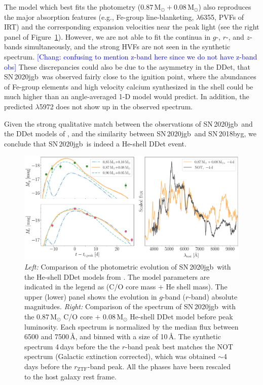 \documentclass[twocolumn]{aastex631}
\newcommand{\sn}{SN\,2020jgb}
\newcommand{\chang}[1]{\textcolor{blue}{[Chang: #1]}}
\begin{document}
The model which best fits the photometry ($0.87\,\mathrm{M_\odot}+0.08\,\mathrm{M_\odot}$) also reproduces the major absorption features (e.g., Fe-group line-blanketing,  $\lambda$6355, PVFs of  IRT) and the corresponding expansion velocities near the peak light (see the right panel of Figure~\ref{fig:model}). However, we are not able to fit the continua in $g$-, $r$-, and $z$-bands simultaneously, and the strong  HVFs are not seen in the synthetic spectrum. \chang{confusing to mention z-band here since we do not have z-band obs} These discrepancies could also be due to the asymmetry in the DDet, that \sn\ was observed fairly close to the ignition point, where the abundances of Fe-group elements and high velocity calcium synthesized in the shell could be much higher than an angle-averaged 1-D model would predict.
In addition, the predicted  $\lambda$5972 does not show up in the observed spectrum.

Given the strong qualitative match between the observations of \sn\ and the DDet models of \citet{polin_observational_2019}, and the similarity between \sn\ and SN\,2018byg, we conclude that \sn\ is indeed a He-shell DDet event. 

\begin{figure}
    \centering
    \includegraphics[width=\textwidth]{model.pdf}
    \caption{{\it Left:} Comparison of the photometric evolution of \sn\ with the He-shell DDet models from \citet{polin_observational_2019}. The model parameters are indicated in the legend as (C/O core mass $+$ He shell mass). The upper (lower) panel shows the evolution in $g$-band ($r$-band) absolute magnitudes. {\it Right:} Comparison of the spectrum of \sn\ with the $0.87\,\mathrm{M_\odot}$ C/O core $+$ $0.08\,\mathrm{M_\odot}$ He-shell DDet model before peak luminosity. Each spectrum is normalized by the median flux between 6500 and 7500\,\AA, and binned with a size of 10\,\AA. The synthetic spectrum 4\,days before the the $r$-band peak best matches the NOT spectrum (Galactic extinction corrected), which was obtained $\sim$4\,days before the $r_\mathrm{ZTF}$-band peak. All the phases have been rescaled to the host galaxy rest frame.}
    \label{fig:model}
\end{figure}
\end{document}
